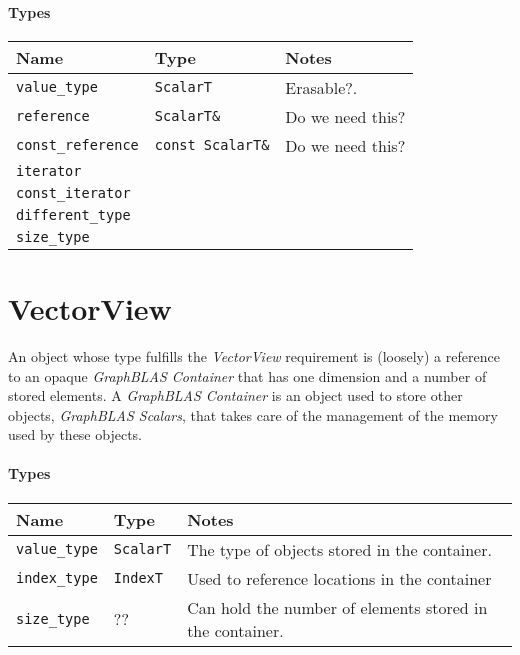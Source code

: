 \paragraph{Types}

\begin{tabularx}{\textwidth}{l l X}
\textbf{Name} & \textbf{Type} & \textbf{Notes}\\
\hline
\texttt{value\_type} & \texttt{ScalarT}  & Erasable?.\\ \hline
\texttt{reference}  & \texttt{ScalarT\&} & Do we need this? \\ \hline
\texttt{const\_reference}  & \texttt{const ScalarT\&} & Do we need this? \\ \hline
\texttt{iterator}  & & \\ \hline
\texttt{const\_iterator}  & & \\ \hline
\texttt{different\_type}  & & \\ \hline
\texttt{size\_type}  & &
\end{tabularx}

\section{VectorView}

An object whose type fulfills the \textit{VectorView} requirement is (loosely) a 
reference to an opaque \textit{GraphBLAS Container} that has one dimension and a 
number of stored elements.  A \textit{GraphBLAS Container} is an object used to store
other objects, \textit{GraphBLAS Scalars}, that takes care of the management of the
memory used by these objects. 



\paragraph{Types}

\begin{tabularx}{\textwidth}{l l X}
\textbf{Name} & \textbf{Type} & \textbf{Notes}\\
\hline
\texttt{value\_type} & \texttt{ScalarT}  & The type of objects stored in the container.\\ \hline
\texttt{index\_type} & \texttt{IndexT}   & Used to reference locations in the container \\ \hline
\texttt{size\_type}  & ??                & Can hold the number of elements stored in the container.
\end{tabularx}

